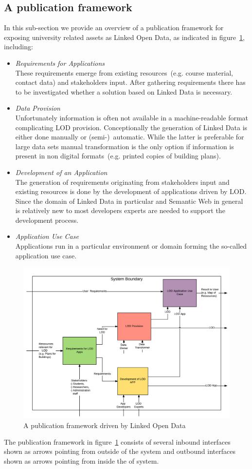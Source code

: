 \documentclass{article}
\begin{document}
\subsection{A publication framework}
In this sub-section we provide an overview of a publication framework for exposing university related assets as Linked Open Data, as indicated in figure~\ref{fig:lod-architecture}, including:
\begin{itemize}
  \item \textit{Requirements for Applications}~\\
  These requirements emerge from existing resources~(e.g. course material, contact data) and stakeholders input. After gathering requirements there has to be investigated whether a solution based on Linked Data is necessary.
  \item \textit{Data Provision}~\\
  Unfortunately information is often not available in a machine-readable format complicating LOD provision. Conceptionally the generation of Linked Data is either done manually or (semi-)~automatic. While the latter is preferable for large data sets manual transformation is the only option if information is present in non digital formats~(e.g. printed copies of building plans).  
  \item \textit{Development of an Application}~\\
  The generation of requirements originating from stakeholders input and existing resources is done by the development of applications driven by LOD. Since the domain of Linked Data in particular and Semantic Web in general is relatively new to most developers experts are needed to support the development process. 
  \item \textit{Application Use Case}~\\
  Applications run in a particular environment or domain forming the so-called application use case. 
\end{itemize}

\begin{figure}[H]
	\centering \includegraphics*[width=.8\columnwidth]{lod_architecture.png}
	\caption{A publication framework driven by Linked Open Data}
	\label{fig:lod-architecture}
\end{figure}
The publication framework in figure~\ref{fig:lod-architecture} consists of several inbound interfaces shown as arrows pointing from outside of the system and outbound interfaces shown as arrows pointing from inside the of system.
\end{document}
